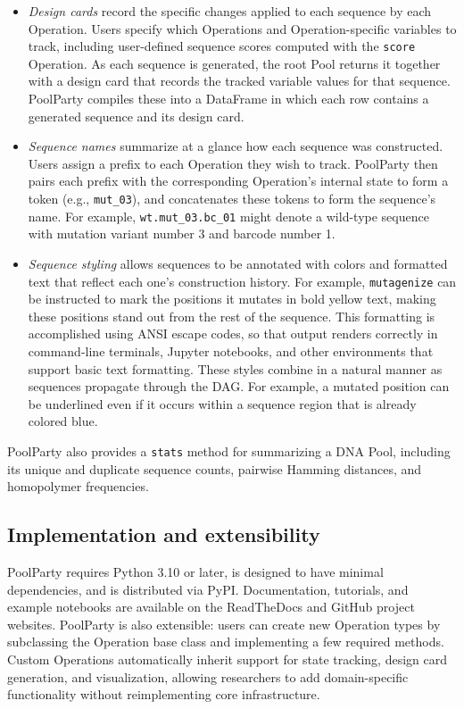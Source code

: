\documentclass[pdflatex,sn-vancouver-num,referee,oneside]{sn-jnl}
\begin{document}
\begin{itemize}
\item \emph{Design cards} record the specific changes applied to each sequence by each Operation. Users specify which Operations and Operation-specific variables to track, including user-defined sequence scores computed with the \texttt{score} Operation. As each sequence is generated, the root Pool returns it together with a design card that records the tracked variable values for that sequence. PoolParty compiles these into a DataFrame in which each row contains a generated sequence and its design card.

\item \emph{Sequence names} summarize at a glance how each sequence was constructed. Users assign a prefix to each Operation they wish to track. PoolParty then pairs each prefix with the corresponding Operation's internal state to form a token (e.g., \texttt{mut\_03}), and concatenates these tokens to form the sequence's name. For example, \texttt{wt.mut\_03.bc\_01} might denote a wild-type sequence with mutation variant number 3 and barcode number 1.

\item \emph{Sequence styling} allows sequences to be annotated with colors and formatted text that reflect each one's construction history. For example, \texttt{mutagenize} can be instructed to mark the positions it mutates in bold yellow text, making these positions stand out from the rest of the sequence. This formatting is accomplished using ANSI escape codes, so that output renders correctly in command-line terminals, Jupyter notebooks, and other environments that support basic text formatting. These styles combine in a natural manner as sequences propagate through the DAG. For example, a mutated position can be underlined even if it occurs within a sequence region that is already colored blue.
\end{itemize}

PoolParty also provides a \texttt{stats} method for summarizing a DNA Pool, including its unique and duplicate sequence counts, pairwise Hamming distances, and homopolymer frequencies.

\subsection*{Implementation and extensibility}\label{subsec:implementation-and-extensibility}

PoolParty requires Python 3.10 or later, is designed to have minimal dependencies, and is distributed via PyPI. Documentation, tutorials, and example notebooks are available on the ReadTheDocs and GitHub project websites. PoolParty is also extensible: users can create new Operation types by subclassing the Operation base class and implementing a few required methods. Custom Operations automatically inherit support for state tracking, design card generation, and visualization, allowing researchers to add domain-specific functionality without reimplementing core infrastructure.
\end{document}
